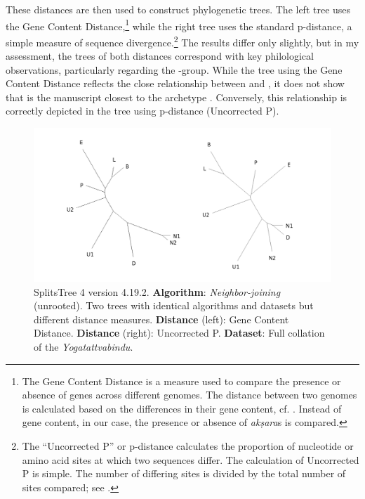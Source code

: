 These distances are then used to construct phylogenetic trees. The left tree uses the Gene Content Distance,\footnote{The Gene Content Distance is a measure used to compare the presence or absence of genes across different genomes. The distance between two genomes is calculated based on the differences in their gene content, cf. \citeauthor[2004]{huson2004}. Instead of gene content, in our case, the presence or absence of \textit{akṣara}s is compared.} while the right tree uses the standard p-distance, a simple measure of sequence divergence.\footnote{The ``Uncorrected P'' or p-distance calculates the proportion of nucleotide or amino acid sites at which two sequences differ. The calculation of Uncorrected P is simple. The number of differing sites is divided by the total number of sites compared; see \citeauthor[2022: 46]{huson2022}.} The results differ only slightly, but in my assessment, the trees of both distances correspond with key philological observations, particularly regarding the \alpha-group. While the tree using the Gene Content Distance reflects the close relationship between  and , it does not show that  is the manuscript closest to the archetype \alpha. Conversely, this relationship is correctly depicted in the tree using p-distance (Uncorrected P).

\begin{figure}[H]
    \centering
    \includegraphics[width=1\textwidth]{pics/tree-nj-x.png} %
    \caption{SplitsTree 4 version 4.19.2. \textbf{Algorithm}: \textit{Neighbor-joining} (unrooted). Two trees with identical algorithms and datasets but different distance measures. \textbf{Distance} (left): Gene Content Distance. \textbf{Distance} (right): Uncorrected P. \textbf{Dataset}: Full collation of the \emph{Yogatattvabindu}.}
    \label{fig:nj-tree}
\end{figure}
\newpage
